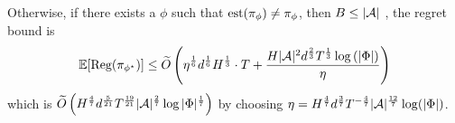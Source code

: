 Otherwise, if there exists a $\phi$ such that $\operatorname*{est}(\pi_{\phi}) \neq \pi_{\phi}$, then $B \le |\mathcal{A}|$ , the regret bound is 
\begin{align*}
    \mathbb{E}[\text{\rm Reg}(\pi_{\phi^\star})] \leq \widetilde{O}\left(\eta^{\frac{1}{6}}d^{\frac{1}{6}}H^{\frac{1}{3}}\cdot T  + \frac{ H|\mathcal{A}|^2d^{\frac{2}{3}}T^{\frac{1}{3}}\log\left(|\Phi|\right)}{\eta}\right)
\end{align*}
which is $\widetilde{O}\left(H^{\frac{4}{7}}d^{\frac{5}{21}}T^{\frac{19}{21}}|\mathcal{A}|^{\frac{2}{7}}\log|\Phi|^{\frac{1}{7}}\right)$ by choosing $\eta = H^{\frac{4}{7}}d^{\frac{3}{7}}T^{-\frac{4}{7}}|\mathcal{A}|^{\frac{12}{7}}\log(|\Phi|)$. 

\fi